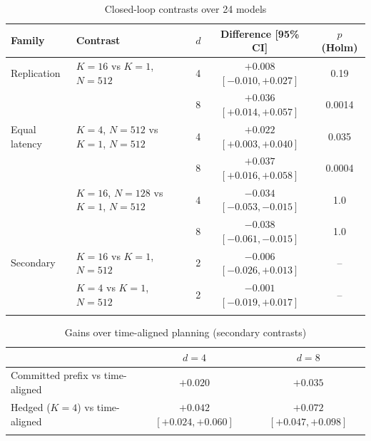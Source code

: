\documentclass[pdflatex,sn-nature]{sn-jnl}%
\begin{document}
\begin{table}[t]
\caption{Closed-loop contrasts over 24 models}\label{tab:contrasts}
\begin{tabular*}{\textwidth}{@{\extracolsep\fill}llccc}
\toprule
Family & Contrast & $d$ & Difference [95\% CI] & $p$ (Holm) \\
\midrule
Replication & $K=16$ vs $K=1$, $N=512$ & 4 & $+0.008$ $[-0.010, +0.027]$ & 0.19 \\
 & & 8 & $+0.036$ $[+0.014, +0.057]$ & 0.0014 \\
Equal latency & $K=4$, $N=512$ vs $K=1$, $N=512$ & 4 & $+0.022$ $[+0.003, +0.040]$ & 0.035 \\
 & & 8 & $+0.037$ $[+0.016, +0.058]$ & 0.0004 \\
 & $K=16$, $N=128$ vs $K=1$, $N=512$ & 4 & $-0.034$ $[-0.053, -0.015]$ & 1.0 \\
 & & 8 & $-0.038$ $[-0.061, -0.015]$ & 1.0 \\
Secondary & $K=16$ vs $K=1$, $N=512$ & 2 & $-0.006$ $[-0.026, +0.013]$ & -- \\
 & $K=4$ vs $K=1$, $N=512$ & 2 & $-0.001$ $[-0.019, +0.017]$ & -- \\
\botrule
\end{tabular*}
\end{table}

\begin{table}[t]
\caption{Gains over time-aligned planning (secondary contrasts)}\label{tab:timealigned}
\begin{tabular*}{\textwidth}{@{\extracolsep\fill}lcc@{}}
\toprule
 & $d=4$ & $d=8$ \\
\midrule
Committed prefix vs time-aligned & $+0.020$ & $+0.035$ \\
Hedged ($K=4$) vs time-aligned & $+0.042$ $[+0.024, +0.060]$ & $+0.072$ $[+0.047, +0.098]$ \\
\botrule
\end{tabular*}
\end{table}
\end{document}
